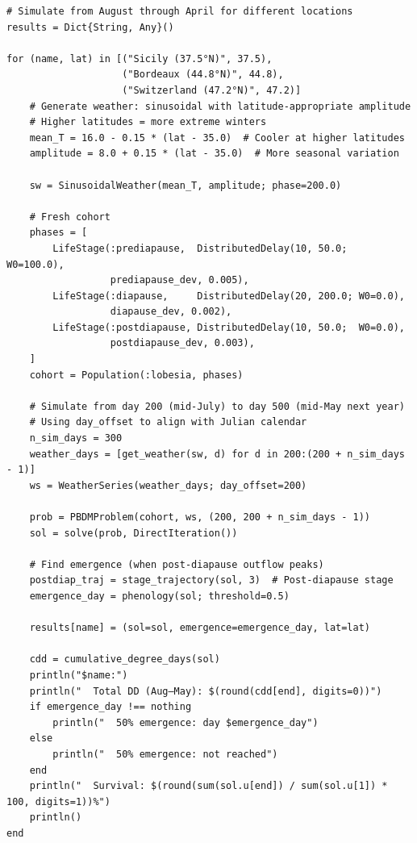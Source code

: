 \label{7256361741809464012}{}



\begin{verbatim}
# Simulate from August through April for different locations
results = Dict{String, Any}()

for (name, lat) in [("Sicily (37.5°N)", 37.5),
                    ("Bordeaux (44.8°N)", 44.8),
                    ("Switzerland (47.2°N)", 47.2)]
    # Generate weather: sinusoidal with latitude-appropriate amplitude
    # Higher latitudes = more extreme winters
    mean_T = 16.0 - 0.15 * (lat - 35.0)  # Cooler at higher latitudes
    amplitude = 8.0 + 0.15 * (lat - 35.0)  # More seasonal variation

    sw = SinusoidalWeather(mean_T, amplitude; phase=200.0)

    # Fresh cohort
    phases = [
        LifeStage(:prediapause,  DistributedDelay(10, 50.0;  W0=100.0),
                  prediapause_dev, 0.005),
        LifeStage(:diapause,     DistributedDelay(20, 200.0; W0=0.0),
                  diapause_dev, 0.002),
        LifeStage(:postdiapause, DistributedDelay(10, 50.0;  W0=0.0),
                  postdiapause_dev, 0.003),
    ]
    cohort = Population(:lobesia, phases)

    # Simulate from day 200 (mid-July) to day 500 (mid-May next year)
    # Using day_offset to align with Julian calendar
    n_sim_days = 300
    weather_days = [get_weather(sw, d) for d in 200:(200 + n_sim_days - 1)]
    ws = WeatherSeries(weather_days; day_offset=200)

    prob = PBDMProblem(cohort, ws, (200, 200 + n_sim_days - 1))
    sol = solve(prob, DirectIteration())

    # Find emergence (when post-diapause outflow peaks)
    postdiap_traj = stage_trajectory(sol, 3)  # Post-diapause stage
    emergence_day = phenology(sol; threshold=0.5)

    results[name] = (sol=sol, emergence=emergence_day, lat=lat)

    cdd = cumulative_degree_days(sol)
    println("$name:")
    println("  Total DD (Aug–May): $(round(cdd[end], digits=0))")
    if emergence_day !== nothing
        println("  50% emergence: day $emergence_day")
    else
        println("  50% emergence: not reached")
    end
    println("  Survival: $(round(sum(sol.u[end]) / sum(sol.u[1]) * 100, digits=1))%")
    println()
end
\end{verbatim}




